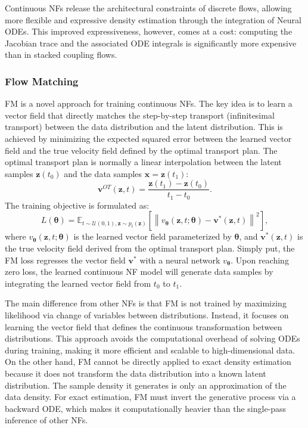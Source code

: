 Continuous \acp{NF} release the architectural constraints of discrete flows, allowing more flexible and expressive density estimation through the integration of Neural \acp{ODE}. This improved expressiveness, however, comes at a cost: computing the Jacobian trace and the associated ODE integrals is significantly more expensive than in stacked coupling flows.

\subsubsection{Flow Matching}
\label{sec:flowmatching}
\ac{FM} \citep{lipman2023flowmatching} is a novel approach for training continuous \acp{NF}. The key idea is to learn a vector field that directly matches the step-by-step transport (infinitesimal transport) between the data distribution and the latent distribution. This is achieved by minimizing the expected squared error between the learned vector field and the true velocity field defined by the optimal transport plan. The optimal transport plan is normally a linear interpolation between the latent samples $\boldsymbol{z}(t_0)$ and the data samples $\boldsymbol{x}=\boldsymbol{z}(t_1)$:
\begin{equation}
    \boldsymbol{v}^{OT}(\boldsymbol{z}, t) = \frac{\boldsymbol{z}(t_1)-\boldsymbol{z}(t_0)}{t_1 - t_0}.
\end{equation}
The training objective is formulated as:
\begin{equation}
    L(\boldsymbol{\theta}) = \mathbb{E}_{t\sim\mathcal{U}(0,1),\boldsymbol{z}\sim p_t(\boldsymbol{z})}\left[\left\|v_{\boldsymbol{\theta}}(\boldsymbol{z}, t; \boldsymbol{\theta}) - \boldsymbol{v}^*(\boldsymbol{z}, t)\right\|^2\right],
\end{equation}
where $v_{\boldsymbol{\theta}}(\boldsymbol{z}, t; \boldsymbol{\theta})$ is the learned vector field parameterized by $\boldsymbol{\theta}$, and $\boldsymbol{v}^*(\boldsymbol{z}, t)$ is the true velocity field derived from the optimal transport plan. Simply put, the \ac{FM} loss regresses the vector field $\boldsymbol{v}^*$ with a neural network $v_{\boldsymbol{\theta}}$. Upon reaching zero loss, the learned continuous \ac{NF} model will generate data samples by integrating the learned vector field from $t_0$ to $t_1$. 

The main difference from other \acp{NF} is that \ac{FM} is not trained by maximizing likelihood via change of variables between distributions. Instead, it focuses on learning the vector field that defines the continuous transformation between distributions. This approach avoids the computational overhead of solving \acp{ODE} during training, making it more efficient and scalable to high-dimensional data. On the other hand, \ac{FM} cannot be directly applied to exact density estimation because it does not transform the data distribution into a known latent distribution. The sample density it generates is only an approximation of the data density. For exact estimation, \ac{FM} must invert the generative process via a backward \ac{ODE}, which makes it computationally heavier than the single-pass inference of other \acp{NF}.

